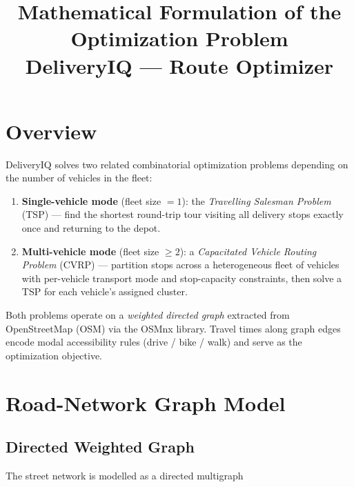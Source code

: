 \documentclass[12pt, a4paper]{article}
\title{%
  \textbf{Mathematical Formulation of the Optimization Problem}\\[0.5em]
  \large DeliveryIQ --- Route Optimizer
}
\author{}
\date{}
\theoremstyle{definition}
\begin{document}
\maketitle
\tableofcontents
\newpage

\section{Overview}

DeliveryIQ solves two related combinatorial optimization problems depending on
the number of vehicles in the fleet:

\begin{enumerate}
  \item \textbf{Single-vehicle mode} (fleet size $= 1$):
        the \emph{Travelling Salesman Problem} (TSP) --- find the shortest
        round-trip tour visiting all delivery stops exactly once and returning
        to the depot.

  \item \textbf{Multi-vehicle mode} (fleet size $\geq 2$):
        a \emph{Capacitated Vehicle Routing Problem} (CVRP) --- partition
        stops across a heterogeneous fleet of vehicles with per-vehicle
        transport mode and stop-capacity constraints, then solve a TSP for each
        vehicle's assigned cluster.
\end{enumerate}

Both problems operate on a \emph{weighted directed graph} extracted from
OpenStreetMap (OSM) via the OSMnx library.  Travel times along graph edges
encode modal accessibility rules (drive / bike / walk) and serve as the
optimization objective.

\section{Road-Network Graph Model}

\subsection{Directed Weighted Graph}

The street network is modelled as a directed multigraph
\end{document}
